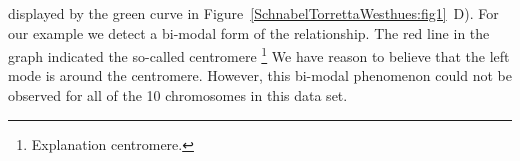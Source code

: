 \documentclass[twoside]{report}
\begin{document}
	displayed by the green curve in Figure~\ref{SchnabelTorrettaWesthues:fig1}~D). For our example we detect a bi-modal form of the 
	relationship. The red line in the graph indicated the so-called centromere \footnote{
	Explanation centromere.} We have reason to believe that the left mode is around the centromere.   
	However, this bi-modal phenomenon could not be observed for 
	all of the 10 chromosomes in this data set.   
%
\end{document}

